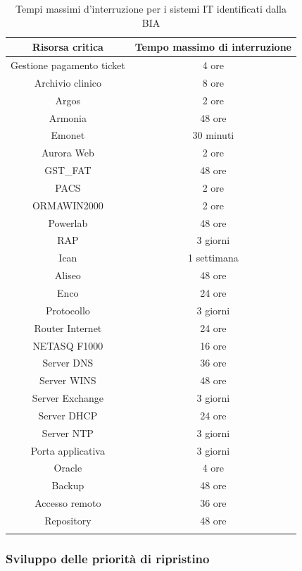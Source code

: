 \documentclass[12pt, a4paper, titlepage]{report}
\begin{document}
		\begin{longtable}{| c | c |}
				\hline
				\textbf{Risorsa critica} & \textbf{Tempo massimo di interruzione} \\ \hline
				Gestione pagamento ticket & 4 ore\\ \hline 
				Archivio clinico & 8 ore\\ \hline
				Argos & 2 ore\\ \hline
				Armonia & 48 ore\\ \hline 
				Emonet & 30 minuti\\ \hline
				Aurora Web & 2 ore\\ \hline
				GST\_FAT & 48 ore\\ \hline 
				PACS & 2 ore\\ \hline 
				ORMAWIN2000 & 2 ore\\ \hline 
				Powerlab & 48 ore\\ \hline 
				RAP & 3 giorni\\ \hline 
				Ican & 1 settimana\\ \hline 
				Aliseo & 48 ore\\ \hline 
				Enco & 24 ore\\ \hline
				Protocollo & 3 giorni\\ \hline 
				Router Internet & 24 ore\\ \hline 
				NETASQ F1000 & 16 ore\\ \hline 
				Server DNS & 36 ore\\ \hline 
				Server WINS & 48 ore\\ \hline 
				Server Exchange & 3 giorni\\ \hline 
				Server DHCP & 24 ore\\ \hline 
				Server NTP & 3 giorni\\ \hline 
				Porta applicativa & 3 giorni\\ \hline 
				Oracle & 4 ore\\ \hline 
				Backup & 48 ore\\ \hline 
				Accesso remoto & 36 ore\\ \hline 
				Repository & 48 ore\\ \hline
				\caption[BIA - Tempi massimi d'interruzione per i sistemi IT]{Tempi massimi d'interruzione per i sistemi IT identificati dalla BIA}
		\end{longtable}
		
		\subsubsection{Sviluppo delle priorità di ripristino}
		
\end{document}
